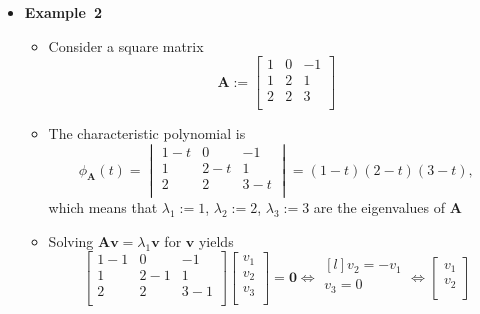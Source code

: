 \documentclass[12pt,a4paper]{article}
\begin{document}
\begin{itemize}
\item \textbf{Example~2}
  \begin{itemize}
  \item Consider a square matrix
    \begin{equation}\nonumber%
      \bm{A} :=
      \begin{bmatrix}
        1 & 0 & -1 \\
        1 & 2 & 1 \\
        2 & 2 & 3 \\
      \end{bmatrix}
    \end{equation}
  \item The characteristic polynomial is
    \begin{equation}\nonumber%
      \phi_{\bm{A}}(t) =
      \begin{vmatrix}
        1-t & 0 & -1 \\
        1 & 2-t & 1 \\
        2 & 2 & 3-t \\
      \end{vmatrix}
      = (1-t)(2-t)(3-t),
    \end{equation}
    which means that
    $\lambda_{1}:=1$,
    $\lambda_{2}:=2$,
    $\lambda_{3}:=3$
    are the eigenvalues of $\bm{A}$
  \item Solving $\bm{A}\bm{v}=\lambda_{1}\bm{v}$ for $\bm{v}$ yields
    \begin{equation}\nonumber%
      \begin{bmatrix}
        1-1 & 0 & -1 \\
        1 & 2-1 & 1 \\
        2 & 2 & 3-1 \\
      \end{bmatrix}
      \begin{bmatrix}
        v_{1} \\
        v_{2} \\
        v_{3} \\
      \end{bmatrix}
      = \bm{0}
      \iff
      \begin{matrix*}[l]
        v_{2} = -v_{1} \\
        v_{3} = 0 \\
      \end{matrix*}
      \iff
      \begin{bmatrix}
        v_{1} \\
        v_{2} \\

\end{bmatrix}
\end{equation}
\end{itemize}
\end{itemize}
\end{document}
